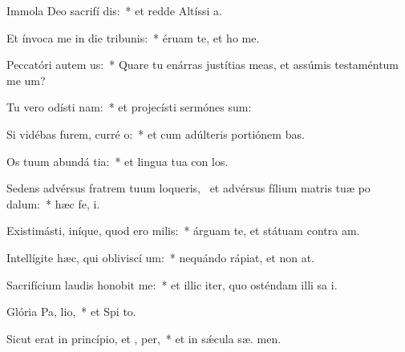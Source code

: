 \item Immola Deo sacrifí dis:~* et redde Altíssi  a.
\item Et ínvoca me in die tribunis:~* éruam te, et ho me.
\item Peccatóri autem  us:~* Quare tu enárras justítias meas, et assúmis testaméntum me   um?
\item Tu vero odísti nam:~* et projecísti sermónes  sum:
\item Si vidébas furem, curré  o:~* et cum adúlteris portiónem  bas.
\item Os tuum abundá tia:~* et lingua tua con los.
\item Sedens advérsus fratrem tuum loqueris,~\pscross{} et advérsus fílium matris tuæ po dalum:~* hæc fe,  i.
\item Existimásti, iníque, quod ero  milis:~* árguam te, et státuam contra  am.
\item Intellígite hæc, qui obliviscí um:~* nequándo rápiat, et non   at.
\item Sacrifícium laudis honobit me:~* et illic iter, quo osténdam illi sa i.
\item Glória Pa,  lio,~* et Spi to.
\item Sicut erat in princípio, et ,  per,~* et in sǽcula sæ. men.

